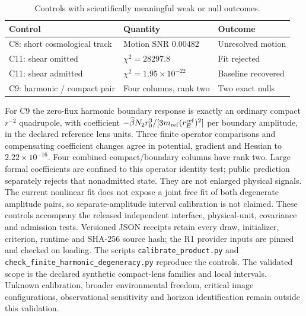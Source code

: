 \begin{table}[tbp]
\centering\small
\caption{Controls with scientifically meaningful weak or null outcomes.}
\label{tab:product-controls}
\begin{tabular}{@{}lll@{}}
\toprule
Control & Quantity & Outcome\\
\midrule
C8: short cosmological track & Motion SNR $0.00482$ & Unresolved motion\\
C11: shear omitted & $\chi^2=28297.8$ & Fit rejected\\
C11: shear admitted & $\chi^2=1.95\times10^{-22}$ & Baseline recovered\\
C9: harmonic / compact pair & Four columns, rank two & Two exact nulls\\
\bottomrule
\end{tabular}
\end{table}

For C9 the zero-flux harmonic boundary response is exactly an ordinary
compact $r^{-2}$ quadrupole, with coefficient
$-\widehat\beta N_2 r_0^3/[3m_{\rm ref}(r_E^{\rm ref})^2]$ per boundary
amplitude, in the declared reference lens units.
Three finite operator comparisons and compensating coefficient changes
agree in potential, gradient and Hessian to $2.22\times10^{-16}$.
Four combined compact/boundary columns have rank two. Large formal
coefficients are confined to this operator identity test; public
prediction separately rejects that nonadmitted state. They are not
enlarged physical signals. The current nonlinear fit does not expose a
joint free fit of both degenerate amplitude pairs, so separate-amplitude
interval calibration is not claimed.
These controls accompany the released independent interface, physical-unit,
covariance and admission tests. Versioned JSON receipts retain every
draw, initializer, criterion, runtime and SHA-256 source hash; the R1
provider inputs are pinned and checked on loading. The scripts
\texttt{calibrate\_product.py} and
\texttt{check\_finite\_harmonic\_degeneracy.py} reproduce the controls.
The validated scope is the declared synthetic compact-lens families and
local intervals. Unknown calibration, broader environmental freedom,
critical image configurations, observational sensitivity and horizon
identification remain outside this validation.
